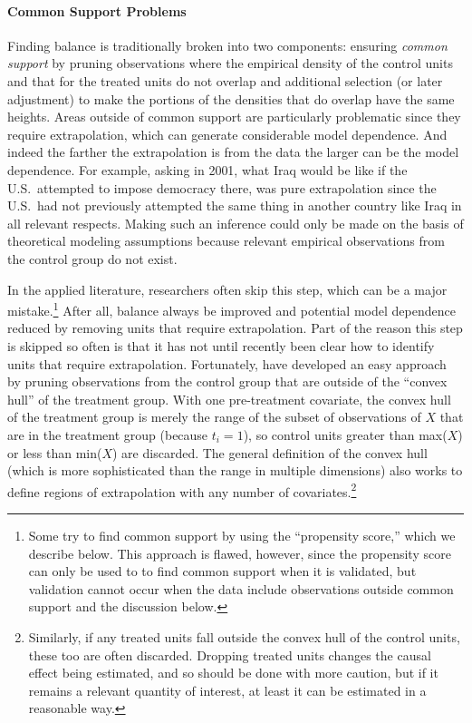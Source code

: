 \documentclass[11pt,titlepage]{article}
\begin{document}
\paragraph{Common Support Problems}

Finding balance is traditionally broken into two components: ensuring
\emph{common support} by pruning observations where the empirical
density of the control units and that for the treated units do not
overlap and additional selection (or later adjustment) to make the
portions of the densities that do overlap have the same heights.
Areas outside of common support are particularly problematic since
they require extrapolation, which can generate considerable model
dependence.  And indeed the farther the extrapolation is from the data
the larger can be the model dependence.  For example, asking in 2001,
what Iraq would be like if the U.S.\ attempted to impose democracy
there, was pure extrapolation since the U.S.\ had not previously
attempted the same thing in another country like Iraq in all relevant
respects.  Making such an inference could only be made on the basis of
theoretical modeling assumptions because relevant empirical
observations from the control group do not exist.

In the applied literature, researchers often skip this step, which can
be a major mistake.\footnote{Some try to find common support by using
  the ``propensity score,'' which we describe below.  This approach is
  flawed, however, since the propensity score can only be used to to
  find common support when it is validated, but validation cannot
  occur when the data include observations outside common support
  \citep[see][]{KinZen06a} and the discussion below.}  After all,
balance always be improved and potential model dependence reduced by
removing units that require extrapolation.  Part of the reason this
step is skipped so often is that it has not until recently been clear
how to identify units that require extrapolation.  Fortunately,
\citet{KinZen06a} have developed an easy approach by pruning
observations from the control group that are outside of the ``convex
hull'' of the treatment group.  With one pre-treatment covariate, the
convex hull of the treatment group is merely the range of the subset
of observations of $X$ that are in the treatment group (because
$t_i=1$), so control units greater than max($X$) or less than min($X$)
are discarded.  The general definition of the convex hull (which is
more sophisticated than the range in multiple dimensions) also works
to define regions of extrapolation with any number of
covariates.\footnote{Similarly, if any treated units fall outside the
  convex hull of the control units, these too are often discarded.
  Dropping treated units changes the causal effect being estimated,
  and so should be done with more caution, but if it remains a
  relevant quantity of interest, at least it can be estimated in a
  reasonable way.}
\end{document}
